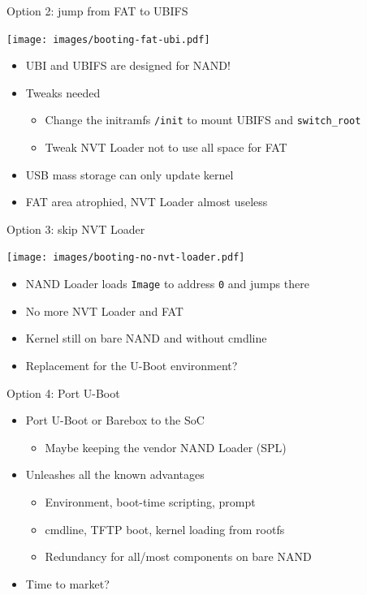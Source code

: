 \documentclass[xetex,table,aspectratio=169]{beamer}
\begin{document}
\begin{frame}{Option 2: jump from FAT to UBIFS}
  \begin{center}
    \texttt{[image: images/booting-fat-ubi.pdf]}
  \end{center}
  \begin{itemize}
  \item UBI and UBIFS are designed for NAND!
  \item Tweaks needed
    \begin{itemize}
    \item Change the initramfs \texttt{/init} to mount UBIFS and \texttt{switch\_root}
    \item Tweak NVT Loader not to use all space for FAT
    \end{itemize}
  \item USB mass storage can only update kernel
  \item FAT area atrophied, NVT Loader almost useless
  \end{itemize}
\end{frame}

\begin{frame}{Option 3: skip NVT Loader}
  \begin{center}
    \texttt{[image: images/booting-no-nvt-loader.pdf]}
  \end{center}
  \begin{itemize}
  \item NAND Loader loads \texttt{Image} to address \texttt{0} and jumps there
  \item No more NVT Loader and FAT
  \item Kernel still on bare NAND and without cmdline
  \item Replacement for the U-Boot environment?
  \end{itemize}
\end{frame}

\begin{frame}{Option 4: Port U-Boot}
  \begin{itemize}
  \item Port U-Boot or Barebox to the SoC
    \begin{itemize}
    \item Maybe keeping the vendor NAND Loader (SPL)
    \end{itemize}
  \item Unleashes all the known advantages
    \begin{itemize}
    \item Environment, boot-time scripting, prompt
    \item cmdline, TFTP boot, kernel loading from rootfs
    \item Redundancy for all/most components on bare NAND
    \end{itemize}
  \item Time to market?
  \end{itemize}
\end{frame}
\end{document}
